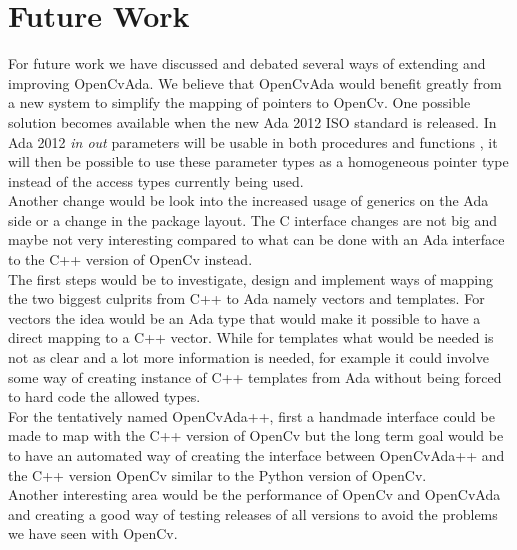  \chapter{Future Work}
For future work we have discussed and debated several ways of extending and improving OpenCvAda. We believe that OpenCvAda would benefit greatly from a new system to simplify the mapping of pointers to OpenCv. One possible solution becomes available when the new Ada 2012 ISO standard is released. In Ada 2012 \textit{in out} parameters will be usable in both procedures and functions \cite{ada2012chart}, it will then be possible to use these parameter types as a homogeneous pointer type instead of the access types currently being used.
\\
Another change would be look into the increased usage of generics on the Ada side or a change in the package layout. The C interface changes are not big and maybe not very interesting compared to what can be done with an Ada interface to the C++ version of OpenCv instead.
\\
The first steps would be to investigate, design and implement ways of mapping the two biggest culprits from C++ to Ada namely vectors and templates. For vectors the idea would be an Ada type that would make it possible to have a direct mapping to a C++ vector. While for templates what would be needed is not as clear and a lot more information is needed, for example it could involve some way of creating instance of C++ templates from Ada without being forced to hard code the allowed types.
\\
For the tentatively named OpenCvAda++, first a handmade interface could be made to map with the C++ version of OpenCv but the long term goal would be to have an automated way of creating the interface between OpenCvAda++ and the C++ version OpenCv similar to the Python version of OpenCv.
\\
Another interesting area would be the performance of OpenCv and OpenCvAda and creating a good way of testing releases of all versions to avoid the problems we have seen with OpenCv.
